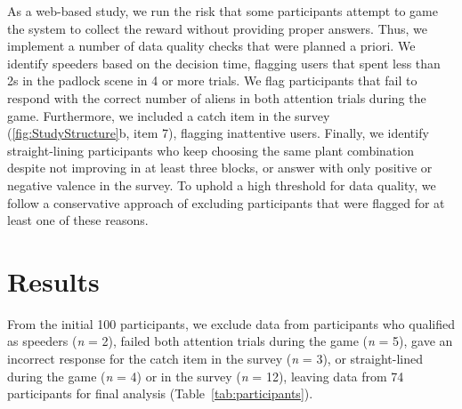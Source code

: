 
As a web-based study, we run the risk that some participants attempt to game the system to collect the reward without providing proper answers. 
Thus, we implement a number of data quality checks that were planned a priori.
We identify speeders based on the decision time, flagging users that spent less than 2s in the padlock scene in 4 or more trials.
We flag participants that fail to respond with the correct number of aliens in both attention trials during the game.
Furthermore, we included a catch item in the survey (\ref{fig:StudyStructure}b, item 7), flagging inattentive users.
Finally, we identify straight-lining participants who keep choosing the same plant combination despite not improving in at least three blocks, or answer with only positive or negative valence in the survey.
To uphold a high threshold for data quality, we follow a conservative approach of excluding participants that were flagged for at least one of these reasons.

\section{Results}\label{sec:results}

From the initial 100 participants, we exclude data from participants who qualified as speeders (\textit{n} = 2), failed both attention trials during the game (\textit{n} = 5), gave an incorrect response for the catch item in the survey (\textit{n} = 3), or straight-lined during the game (\textit{n} = 4) or in the survey (\textit{n} = 12), leaving data from 74 participants for final analysis (Table~\ref{tab:participants}).

